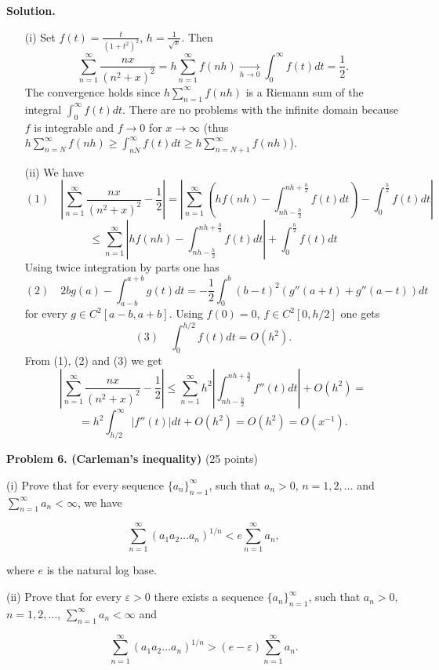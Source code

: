 \documentclass{article}
\begin{document}
\textbf{Solution.}
\begin{itemize}
    \item[(i)] Set $f(t) = \frac{t}{(1 + t^2)^2}$, $h = \frac{1}{\sqrt{x}}$. Then
    \[
    \sum_{n=1}^{\infty} \frac{nx}{(n^2 + x)^2} = h \sum_{n=1}^{\infty} f(nh) \xrightarrow[h \to 0]{}
    \int_{0}^{\infty} f(t)dt = \frac{1}{2}.
    \]
    The convergence holds since $h \sum_{n=1}^{\infty} f(nh)$ is a Riemann sum of the integral $\int_{0}^{\infty} f(t)dt$. There are no problems with the infinite domain because $f$ is integrable and $f \to 0$ for $x \to \infty$ (thus $h \sum_{n=N}^{\infty} f(nh) \geq \int_{nN}^{\infty} f(t) dt \geq h \sum_{n=N+1}^{\infty} f(nh)$).
    \item[(ii)] We have
    \[
    (1) \quad \left| \sum_{n=1}^{\infty} \frac{nx}{(n^2 + x)^2} - \frac{1}{2} \right| =
    \left| \sum_{n=1}^{\infty} \left( hf(nh) - \int_{nh-\frac{h}{2}}^{nh+\frac{h}{2}} f(t)dt \right) - \int_{0}^{\frac{h}{2}} f(t)dt \right|
    \]
    \[
    \leq \sum_{n=1}^{\infty} \left| hf(nh) - \int_{nh-\frac{h}{2}}^{nh+\frac{h}{2}} f(t)dt \right| + \int_{0}^{\frac{h}{2}} f(t)dt
    \]
    Using twice integration by parts one has
    \[
    (2) \quad 2bg(a) - \int_{a-b}^{a+b} g(t)dt = -\frac{1}{2} \int_{0}^{b} (b-t)^2(g''(a + t) + g''(a - t))dt
    \]
    for every \( g \in C^2[a - b, a + b] \). Using \( f(0) = 0 \), \( f \in C^2[0, h/2] \) one gets
    \[
    (3) \quad \int_{0}^{h/2} f(t)dt = O(h^2).
    \]
    From (1), (2) and (3) we get
    \[
    \left| \sum_{n=1}^{\infty} \frac{nx}{(n^2 + x)^2} - \frac{1}{2} \right| \leq \sum_{n=1}^{\infty} h^2 \left| \int_{nh-\frac{h}{2}}^{nh+\frac{h}{2}} f''(t)dt \right| + O(h^2) =
    \]
    \[
    = h^2 \int_{h/2}^{\infty} |f''(t)|dt + O(h^2) = O(h^2) = O(x^{-1}).
    \]
\end{itemize}


\textbf{Problem 6. (Carleman’s inequality)} (25 points)

(i) Prove that for every sequence \(\{a_n\}_{n=1}^\infty\), such that \(a_n > 0\), \(n = 1,2,\ldots\) and \(\sum_{n=1}^{\infty} a_n < \infty\), we have

\[
\sum_{n=1}^{\infty} (a_1 a_2 \ldots a_n)^{1/n} < e \sum_{n=1}^{\infty} a_n,
\]

where \( e \) is the natural log base.

(ii) Prove that for every \( \varepsilon > 0 \) there exists a sequence \(\{a_n\}_{n=1}^\infty\), such that \(a_n > 0\), \(n = 1,2,\ldots\), \(\sum_{n=1}^{\infty} a_n < \infty\) and

\[
\sum_{n=1}^{\infty} (a_1 a_2 \ldots a_n)^{1/n} > (e - \varepsilon) \sum_{n=1}^{\infty} a_n.
\]
\end{document}
